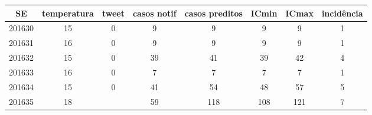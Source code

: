 \begin{tabular}{c|ccccccc}
  \hline
SE & temperatura & tweet & casos notif & casos preditos & ICmin & ICmax & incidência \\ 
  \hline
201630 & 15 & 0 & 9 & 9 & 9 & 9 & 1 \\ 
  201631 & 16 & 0 & 9 & 9 & 9 & 9 & 1 \\ 
  201632 & 15 & 0 & 39 & 41 & 39 & 42 & 4 \\ 
  201633 & 16 & 0 & 7 & 7 & 7 & 7 & 1 \\ 
  201634 & 15 & 0 & 41 & 54 & 48 & 57 & 5 \\ 
  201635 & 18 &  & 59 & 118 & 108 & 121 & 7 \\ 
   \hline
\end{tabular}
